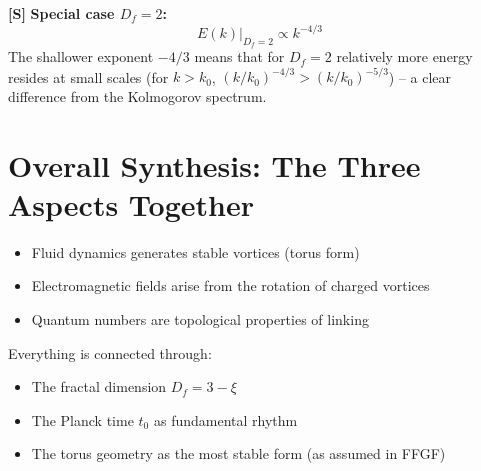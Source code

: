 \textbf{[S]} \textbf{Special case \(D_f = 2\):}
\[
E(k)\big|_{D_f=2} \propto k^{-4/3}
\]
The shallower exponent \(-4/3\) means that for $D_f = 2$ relatively more energy resides at small scales (for $k > k_0$, $(k/k_0)^{-4/3} > (k/k_0)^{-5/3}$) -- a clear difference from the Kolmogorov spectrum.

\section{Overall Synthesis: The Three Aspects Together}
\begin{itemize}
	\item Fluid dynamics generates stable vortices (torus form)
	\item Electromagnetic fields arise from the rotation of charged vortices
	\item Quantum numbers are topological properties of linking
\end{itemize}

Everything is connected through:
\begin{itemize}
	\item The fractal dimension \( D_f = 3 - \xi \)
	\item The Planck time \( t_0 \) as fundamental rhythm
	\item The torus geometry as the most stable form (as assumed in FFGF)
\end{itemize}
